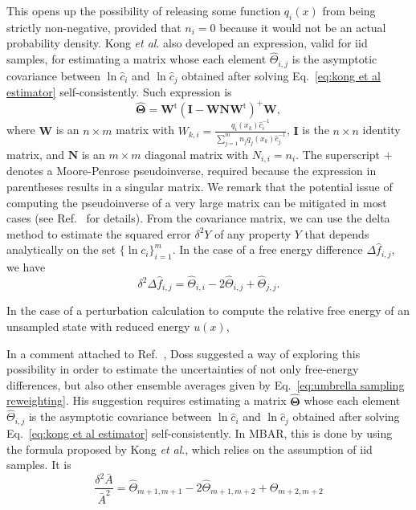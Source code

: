 \documentclass[aip,jcp,preprint,amsmath,amssymb]{revtex4-1}
\newcommand{\mt}[1]{\boldsymbol{\mathbf{#1}}}           %
\newcommand{\tr}[1]{#1^\text{t}}                        %
\begin{document}
This opens up the possibility of releasing some function $q_i(x)$ from being strictly non-negative, provided that $n_i = 0$ because it would not be an actual probability density. Kong \textit{et al}.\cite{Kong_2003} also developed an expression, valid for iid samples, for estimating a matrix whose each element $\hat \Theta_{i,j}$ is the asymptotic covariance between $\ln \hat c_i$ and $\ln \hat c_j$ obtained after solving Eq.~\eqref{eq:kong et al estimator} self-consistently. Such expression is
\begin{equation}
\label{eq:mbar covariance matrix}
\hat{\mt \Theta} = \tr{\mt W}(\mt I - {\mt W}{\mt N}\tr{\mt W})^+{\mt W},
\end{equation}
where $\mt W$ is an $n \times m$ matrix with $W_{k,i} = \frac{q_i(x_k) \hat c_i^{-1}}{\sum_{j=1}^m n_j q_j(x_k) \hat c_j^{-1}}$, $\mt I$ is the $n \times n$ identity matrix, and $\mt N$ is an $m \times m$ diagonal matrix with $N_{i,i} = n_i$. The superscript $+$ denotes a Moore-Penrose pseudoinverse, required because the expression in parentheses results in a singular matrix. We remark that the potential issue of computing the pseudoinverse of a very large matrix can be mitigated in most cases (see Ref.~ for details). From the covariance matrix, we can use the delta method\cite{Greene_2012} to estimate the squared error $\delta^2 Y$ of any property $Y$ that depends analytically on the set $\{\ln c_i\}_{i=1}^m$. In the case of a free energy difference $\Delta \hat f_{i,j}$, we have
\begin{equation}
\label{eq:mbar free mean-square error}
\delta^2 \Delta {\hat f_{i,j}} = {\hat \Theta}_{i,i} - 2 {\hat \Theta}_{i,j} + {\hat \Theta}_{j,j}.
\end{equation}

In the case of a perturbation calculation to compute the relative free energy of an unsampled state with reduced energy $u(x)$, 

In a comment attached to Ref.~, Doss suggested a way of exploring this possibility in order to estimate the uncertainties of not only free-energy differences, but also other ensemble averages given by Eq.~\eqref{eq:umbrella sampling reweighting}. His suggestion requires estimating a matrix $\hat {\mt \Theta}$ whose each element $\hat \Theta_{i,j}$ is the asymptotic covariance between $\ln \hat c_i$ and $\ln \hat c_j$ obtained after solving Eq.~\eqref{eq:kong et al estimator} self-consistently. In MBAR, this is done by using the formula proposed by Kong \textit{et al}.,\cite{Kong_2003} which relies on the assumption of iid samples. It is
\begin{equation*}
\frac{\delta^2 \bar A}{\bar A^2} = {\hat \Theta}_{m+1,m+1} - 2 {\hat \Theta}_{m+1,m+2} + {\hat \Theta}_{m+2,m+2}
\end{equation*}
\end{document}
